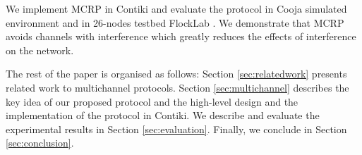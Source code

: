

We implement MCRP in Contiki and evaluate the protocol in Cooja simulated environment and in 26-nodes testbed FlockLab \cite{flocklab}. We demonstrate that MCRP avoids channels with interference which greatly reduces the effects of interference on the network.

The rest of the paper is organised as follows: Section \ref{sec:relatedwork} presents related work to multichannel protocols. Section \ref{sec:multichannel} describes the key idea of our proposed protocol and the high-level design and the implementation of the protocol in Contiki. We describe and evaluate the experimental results in Section \ref{sec:evaluation}. Finally, we conclude in Section \ref{sec:conclusion}.